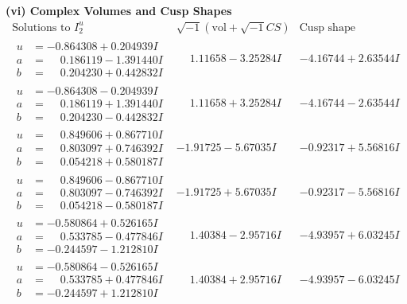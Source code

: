 \documentclass[1p]{elsarticle_modified}
\theoremstyle{definition}
\newcommand{\I}{\sqrt{-1}}
\begin{document}
\newpage\flushleft \textbf{(vi) Complex Volumes and Cusp Shapes}
$$\begin{array}{c|c|c}  
\text{Solutions to }I^u_{2}& \I (\text{vol} + \sqrt{-1}CS) & \text{Cusp shape}\\
 \hline 
\begin{aligned}
u &= -0.864308 + 0.204939 I \\
a &= \phantom{-}0.186119 - 1.391440 I \\
b &= \phantom{-}0.204230 + 0.442832 I\end{aligned}
 & \phantom{-}1.11658 - 3.25284 I & -4.16744 + 2.63544 I \\ \hline\begin{aligned}
u &= -0.864308 - 0.204939 I \\
a &= \phantom{-}0.186119 + 1.391440 I \\
b &= \phantom{-}0.204230 - 0.442832 I\end{aligned}
 & \phantom{-}1.11658 + 3.25284 I & -4.16744 - 2.63544 I \\ \hline\begin{aligned}
u &= \phantom{-}0.849606 + 0.867710 I \\
a &= \phantom{-}0.803097 + 0.746392 I \\
b &= \phantom{-}0.054218 + 0.580187 I\end{aligned}
 & -1.91725 - 5.67035 I & -0.92317 + 5.56816 I \\ \hline\begin{aligned}
u &= \phantom{-}0.849606 - 0.867710 I \\
a &= \phantom{-}0.803097 - 0.746392 I \\
b &= \phantom{-}0.054218 - 0.580187 I\end{aligned}
 & -1.91725 + 5.67035 I & -0.92317 - 5.56816 I \\ \hline\begin{aligned}
u &= -0.580864 + 0.526165 I \\
a &= \phantom{-}0.533785 - 0.477846 I \\
b &= -0.244597 - 1.212810 I\end{aligned}
 & \phantom{-}1.40384 - 2.95716 I & -4.93957 + 6.03245 I \\ \hline\begin{aligned}
u &= -0.580864 - 0.526165 I \\
a &= \phantom{-}0.533785 + 0.477846 I \\
b &= -0.244597 + 1.212810 I\end{aligned}
 & \phantom{-}1.40384 + 2.95716 I & -4.93957 - 6.03245 I \\ \hline\begin{aligned}

\end{aligned}
\end{array}$$
\end{document}
